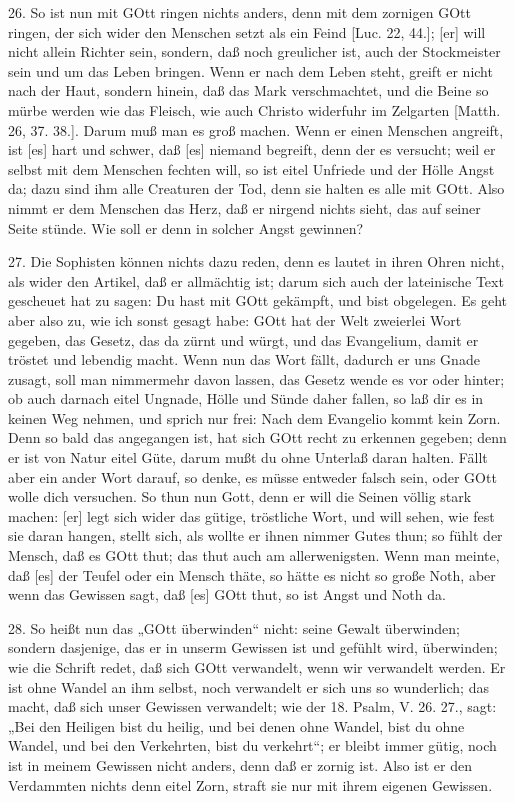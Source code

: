 26. So ist nun mit GOtt ringen nichts anders, denn mit dem zornigen GOtt ringen, der sich wider den Menschen setzt als ein Feind [Luc. 22, 44.]; [er] will nicht allein Richter sein, sondern, daß noch greulicher ist, auch der Stockmeister sein und um das Leben bringen. Wenn er nach dem Leben steht, greift er nicht nach der Haut, sondern hinein, daß das Mark verschmachtet, und die Beine so mürbe werden wie das Fleisch, wie auch Christo widerfuhr im Zelgarten [Matth. 26, 37. 38.]. Darum muß man es groß machen. Wenn er einen Menschen angreift, ist [es] hart und schwer, daß [es] niemand begreift, denn der es versucht; weil er selbst mit dem Menschen fechten will, so ist eitel Unfriede und der Hölle Angst da; dazu sind ihm alle Creaturen der Tod, denn sie halten es alle mit GOtt. Also nimmt er dem Menschen das Herz, daß er nirgend nichts sieht, das auf seiner Seite stünde. Wie soll er denn in solcher Angst gewinnen?

27. Die Sophisten können nichts dazu reden, denn es lautet in ihren Ohren nicht, als wider den Artikel, daß er allmächtig ist; darum sich auch der lateinische Text gescheuet hat zu sagen: Du hast mit GOtt gekämpft, und bist obgelegen. Es geht aber also zu, wie ich sonst gesagt habe: GOtt hat der Welt zweierlei Wort gegeben, das Gesetz, das da zürnt und würgt, und das Evangelium, damit er tröstet und lebendig macht. Wenn nun das Wort fällt, dadurch er uns Gnade zusagt, soll man nimmermehr davon lassen, das Gesetz wende es vor oder hinter; ob auch darnach eitel Ungnade, Hölle und Sünde daher fallen, so laß dir es in keinen Weg nehmen, und sprich nur frei: Nach dem Evangelio kommt kein Zorn. Denn so bald das angegangen ist, hat sich GOtt recht zu erkennen gegeben; denn er ist von Natur eitel Güte, darum mußt du ohne Unterlaß daran halten. Fällt aber ein ander Wort darauf, so denke, es müsse entweder falsch sein, oder GOtt wolle dich versuchen. So thun nun Gott, denn er will die Seinen völlig stark machen: [er] legt sich wider das gütige, tröstliche Wort, und will sehen, wie fest sie daran hangen, stellt sich, als wollte er ihnen nimmer
Gutes thun; so fühlt der Mensch, daß es GOtt thut; das thut auch am allerwenigsten. Wenn man meinte, daß [es] der Teufel oder ein Mensch thäte, so hätte es nicht so große Noth, aber wenn das Gewissen sagt, daß [es] GOtt thut, so ist Angst und Noth da.

28. So heißt nun das „GOtt überwinden“ nicht: seine Gewalt überwinden; sondern dasjenige, das er in unserm Gewissen ist und gefühlt wird, überwinden; wie die Schrift redet, daß sich GOtt verwandelt, wenn wir verwandelt werden. Er ist ohne Wandel an ihm selbst, noch verwandelt er sich uns so wunderlich; das macht, daß sich unser Gewissen verwandelt; wie der 18. Psalm, V. 26. 27., sagt: „Bei den Heiligen bist du heilig, und bei denen ohne Wandel, bist du ohne Wandel, und bei den Verkehrten, bist du verkehrt“; er bleibt immer gütig, noch ist in meinem Gewissen nicht anders, denn daß er zornig ist. Also ist er den Verdammten nichts denn eitel Zorn, straft sie nur mit ihrem eigenen Gewissen.

